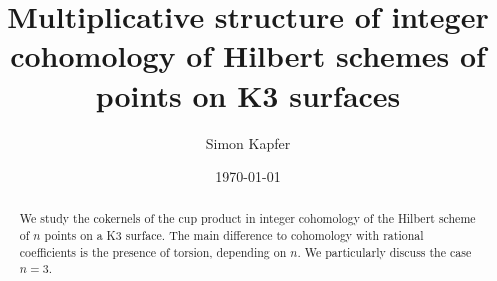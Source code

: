 \documentclass{amsart}
\DeclareMathOperator{\Hilb}{Hilb}
\newcommand{\IZ}{\mathbb{Z}}
\theoremstyle{plain}
\theoremstyle{definition}
\theoremstyle{remark}
\begin{document}
\title[Multiplicative structure of $H^\ast(\Hilb^n(K3), \IZ)$]{Multiplicative structure of integer cohomology of Hilbert schemes of points on K3 surfaces}


\author{Simon Kapfer}
\address{Simon Kapfer, Lehrstuhl f\"ur Algebra und Zahlentheorie, Universit\"ats\-stra{\ss}e~14, D-86159 Augsburg}


\date{\today}



\begin{abstract} 
We study the cokernels of the cup product in integer cohomology of the Hilbert scheme of $n$ points on a K3 surface. The main difference to cohomology with rational coefficients is the presence of torsion, depending on $n$. We particularly discuss the case $n=3$.
\end{abstract}

\maketitle


\end{document}
